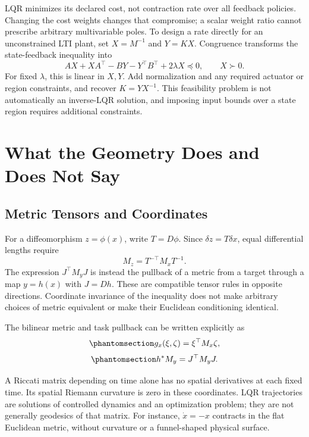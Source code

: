 \documentclass[
  10pt,
  letterpaper,
  DIV=11,
  numbers=noendperiod]{scrartcl}
\begin{document}
LQR minimizes its declared cost, not contraction rate over all feedback
policies. Changing the cost weights changes that compromise; a scalar
weight ratio cannot prescribe arbitrary multivariable poles. To design a
rate directly for an unconstrained LTI plant, set \(X=M^{-1}\) and
\(Y=KX\). Congruence transforms the state-feedback inequality into \[
AX+XA^\top-BY-Y^\top B^\top+2\lambda X\preceq0,
\qquad X\succ0.
\] For fixed \(\lambda\), this is linear in \(X,Y\). Add normalization
and any required actuator or region constraints, and recover
\(K=YX^{-1}\). This feasibility problem is not automatically an
inverse-LQR solution, and imposing input bounds over a state region
requires additional constraints.

\section{What the Geometry Does and Does Not
Say}\label{what-the-geometry-does-and-does-not-say}

\subsection{Metric Tensors and
Coordinates}\label{metric-tensors-and-coordinates}

For a diffeomorphism \(z=\phi(x)\), write \(T=D\phi\). Since
\(\delta z=T\delta x\), equal differential lengths require \[
M_z=T^{-\top}M_xT^{-1}.
\] The expression \(J^\top M_yJ\) is instead the pullback of a metric
from a target through a map \(y=h(x)\) with \(J=Dh\). These are
compatible tensor rules in opposite directions. Coordinate invariance of
the inequality does not make arbitrary choices of metric equivalent or
make their Euclidean conditioning identical.

The bilinear metric and task pullback can be written explicitly as
\begin{equation}\phantomsection\label{eq-metric-tensor}{
g_x(\xi,\zeta)=\xi^\top M_x\zeta,
}\end{equation}
\begin{equation}\phantomsection\label{eq-pullback-metric}{
h^*M_y=J^\top M_yJ.
}\end{equation}

A Riccati matrix depending on time alone has no spatial derivatives at
each fixed time. Its spatial Riemann curvature is zero in these
coordinates. LQR trajectories are solutions of controlled dynamics and
an optimization problem; they are not generally geodesics of that
matrix. For instance, \(\dot x=-x\) contracts in the flat Euclidean
metric, without curvature or a funnel-shaped physical surface.
\end{document}
